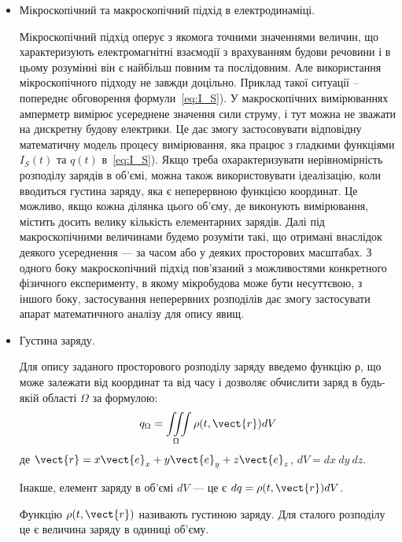 \begin{itemize}
\item Мікроскопічний та макроскопічний підхід в електродинаміці.



Мікроскопічний підхід оперує з якомога точними значеннями величин, що характеризують електромагнітні взаємодії з врахуванням будови речовини і в цьому
розумінні він є найбільш повним та послідовним. Але використання мікроскопічного підходу не завжди доцільно. Приклад такої ситуації – попереднє
обговорення формули~\eqref{eq:I_S}). У макроскопічних вимірюваннях амперметр вимірює усереднене значення сили струму, і тут можна не зважати на
дискретну будову електрики. Це дає змогу застосовувати відповідну математичну модель процесу вимірювання, яка працює з гладкими функціями $I_S(t)$ та
$q(t)$ в~\eqref{eq:I_S}). Якщо треба охарактеризувати нерівномірність розподілу зарядів в об’ємі, можна також використовувати ідеалізацію, коли
вводиться густина заряду, яка є неперервною функцією координат. Це можливо, якщо кожна ділянка цього об’єму, де виконують вимірювання, містить досить
велику кількість елементарних зарядів. Далі під макроскопічними величинами будемо розуміти такі, що отримані внаслідок деякого усереднення --- за часом
або у деяких просторових масштабах. З одного боку макроскопічний підхід пов’язаний з можливостями конкретного фізичного експерименту, в якому
мікробудова може бути несуттєвою, з іншого боку, застосування неперервних розподілів дає змогу застосувати апарат математичного аналізу для опису явищ.



\item  Густина заряду.


Для опису заданого просторового розподілу заряду
введемо функцію ρ, що може залежати від координат та від часу і дозволяє
обчислити заряд в будь-якій області $\Omega$ за формулою:
\begin{equation}\label{eq:q}
    q_{\Omega} = \iiint\limits_{\Omega} \rho(t, \vect{r}) dV
\end{equation}
де $\vect{r} = x\vect{e}_x + y\vect{e}_y + z\vect{e}_z$, $dV=dx\ dy\ dz$.

Інакше, елемент заряду в об’ємі $dV$ --- це є $dq = \rho(t, \vect{r}) dV$.

Функцію $\rho(t, \vect{r})$ називають густиною заряду. Для сталого розподілу це є
величина заряду в одиниці об’єму.


\end{itemize}
